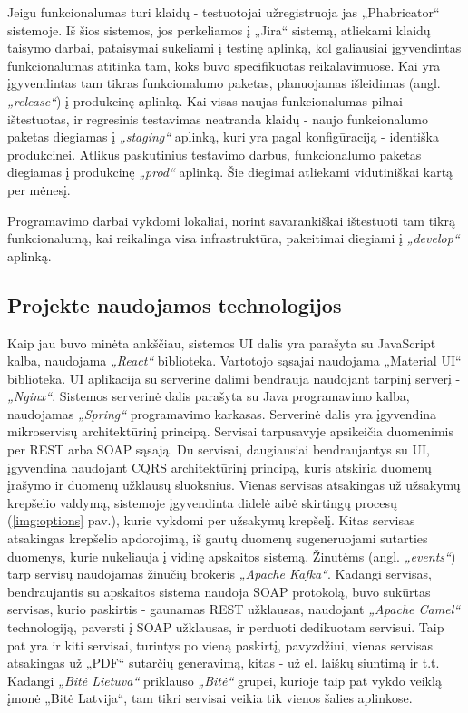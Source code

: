 Jeigu funkcionalumas turi klaidų - testuotojai užregistruoja jas „Phabricator“ sistemoje. Iš šios sistemos, jos perkeliamos į „Jira“ sistemą, atliekami klaidų taisymo darbai, pataisymai
sukeliami į testinę aplinką, kol galiausiai įgyvendintas funkcionalumas atitinka tam, koks buvo specifikuotas reikalavimuose.
Kai yra įgyvendintas tam tikras funkcionalumo paketas, planuojamas išleidimas (angl. \textit{„release“}) į produkcinę aplinką.
Kai visas naujas funkcionalumas pilnai ištestuotas, ir regresinis testavimas neatranda klaidų - naujo funkcionalumo paketas diegiamas į \textit{„staging“} aplinką,
kuri yra pagal konfigūraciją - identiška produkcinei. Atlikus paskutinius testavimo darbus, funkcionalumo paketas
diegiamas į produkcinę \textit{„prod“} aplinką. Šie diegimai atliekami vidutiniškai kartą per mėnesį.

Programavimo darbai vykdomi lokaliai, norint savarankiškai ištestuoti tam tikrą funkcionalumą, kai reikalinga visa infrastruktūra, pakeitimai diegiami į \textit{„develop“} aplinką.


\subsection{Projekte naudojamos technologijos}
Kaip jau buvo minėta ankščiau, sistemos UI dalis yra parašyta su JavaScript kalba, naudojama \textit{„React“} biblioteka. Vartotojo sąsajai naudojama „Material UI“ biblioteka.
UI aplikacija su serverine dalimi bendrauja naudojant tarpinį serverį - \textit{„Nginx“}.
Sistemos serverinė dalis parašyta su Java programavimo kalba, naudojamas \textit{„Spring“} programavimo karkasas. Serverinė dalis yra
įgyvendina mikroservisų architektūrinį principą. Servisai tarpusavyje apsikeičia duomenimis per
REST arba SOAP sąsają. Du servisai, daugiausiai bendraujantys su UI, įgyvendina naudojant CQRS architektūrinį principą,
kuris atskiria duomenų įrašymo ir duomenų užklausų sluoksnius. Vienas servisas atsakingas už užsakymų krepšelio valdymą, sistemoje įgyvendinta didelė
aibė skirtingų procesų (\ref{img:options} pav.),
kurie vykdomi per užsakymų krepšelį. Kitas servisas atsakingas krepšelio apdorojimą, iš gautų duomenų sugeneruojami sutarties duomenys, kurie nukeliauja į vidinę apskaitos sistemą.
Žinutėms (angl. \textit{„events“}) tarp servisų naudojamas žinučių brokeris \textit{„Apache Kafka“}. Kadangi servisas, bendraujantis su apskaitos sistema naudoja SOAP protokolą, buvo sukūrtas
servisas, kurio paskirtis - gaunamas REST užklausas, naudojant \textit{„Apache Camel“} technologiją, paversti į SOAP užklausas, ir perduoti dedikuotam servisui.
Taip pat yra ir kiti servisai, turintys po vieną paskirtį, pavyzdžiui, vienas servisas atsakingas už „PDF“ sutarčių generavimą, kitas - už el. laiškų siuntimą ir t.t.
Kadangi \textit{„Bitė Lietuva“} priklauso \textit{„Bitė“} grupei, kurioje taip pat vykdo veiklą įmonė „Bitė Latvija“, tam tikri servisai veikia tik vienos šalies aplinkose.


